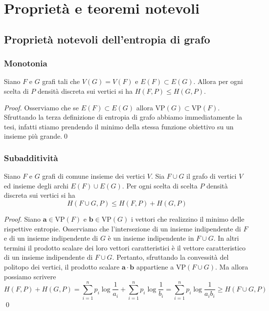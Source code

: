 \chapter{Proprietà e teoremi notevoli}
\section{Proprietà notevoli dell'entropia di grafo}
\subsection{Monotonia} 
\begin{lemma}
	Siano \(F\) e \(G\) grafi tali che \(V(G)=V(F)\) e \(E(F)\subset E(G)\). Allora per ogni scelta di \(P\) densità discreta sui vertici si ha \(H(F,P)\le H(G,P)\). 
\end{lemma}
\begin{proof}
	Osserviamo che se \(E(F)\subset E(G)\) allora \(\text{VP}(G)\subset \text{VP}(F)\). Sfruttando la terza definizione di entropia di grafo abbiamo immediatamente la tesi, infatti stiamo prendendo il minimo della stessa funzione obiettivo su un insieme più grande.\qed 
\end{proof}

\subsection{Subadditività} 
\begin{lemma}
	Siano \(F\) e \(G\) grafi di comune insieme dei vertici \(V\). Sia \(F\cup G\) il grafo di vertici \(V\) ed insieme degli archi \(E(F)\cup E(G)\). Per ogni scelta di scelta \(P\) densità discreta sui vertici si ha
	\[H(F\cup G,P)\le H(F,P)+H(G,P)\]
\end{lemma}
\begin{proof}
	Siano \(\mathbf{a}\in \text{VP}(F)\) e \(\mathbf{b}\in \text{VP}(G)\) i vettori che realizzino il minimo delle rispettive entropie. Osserviamo che l'intersezione di un insieme indipendente di \(F\) e di un insieme indipendente di \(G\) è un insieme indipendente in \(F\cup G\). In altri termini il prodotto scalare dei loro vettori caratteristici è il vettore caratteristico di un insieme indipendente di \(F\cup G\). Pertanto, sfruttando la convessità del politopo dei vertici, il prodotto scalare \(\mathbf{a}\cdot \mathbf{b}\) appartiene a \(\text{VP}(F\cup G)\). Ma allora possiamo scrivere
	\[H(F,P)+H(G,P)=\sum_{i=1}^n p_i\log{\frac{1}{a_i}}+\sum_{i=1}^n p_i\log{\frac{1}{b_i}}=\sum_{i=1}^n p_i\log{\frac{1}{a_{i}b_{i}}}\ge H(F\cup G,P)\]
	\qed 
\end{proof}

